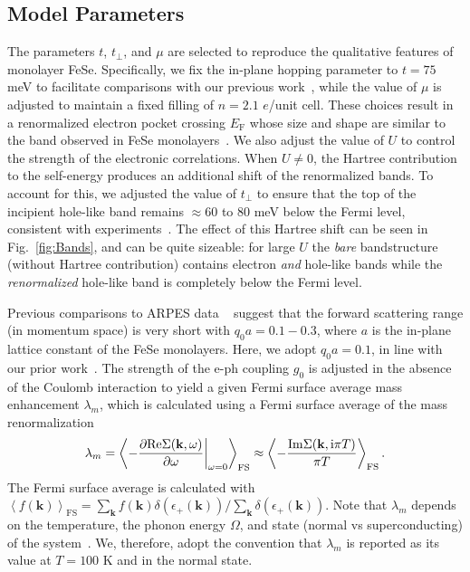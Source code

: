 \documentclass[%
 reprint,
 superscriptaddress,
nofootinbib,
nobibnotes,
 amsmath,amssymb,
 aps,
 prb,
 dvipsnames, 
 floatfix
]{revtex4-2}
\newcommand{\eph}{e-ph}
\begin{document}
\subsection{Model Parameters}
The parameters $t$, $t_\perp$, and $\mu$ are selected to reproduce the qualitative features of monolayer FeSe. Specifically, we fix the in-plane hopping parameter to $t = 75$ meV to facilitate comparisons with our previous work~\cite{Rademaker2016,WangSUST}, while the value of $\mu$ is adjusted to maintain a fixed filling 
of $n = 2.1$ $e$/unit cell. These choices result in a renormalized electron pocket crossing $E_\mathrm{F}$ whose size and shape are similar to the band observed in FeSe monolayers~\cite{Rademaker2016}. We also adjust the value of $U$ to control the strength of the electronic correlations. 
When $U\ne 0$, the Hartree contribution to the self-energy produces 
an additional shift of the renormalized bands. To account for this, we adjusted the value of $t_\perp$ to ensure that the top of the incipient hole-like band remains $\approx 60$ to $80$ meV below the Fermi level, consistent with experiments~\cite{He:2013cna, Lee2014, Shigekawa24470}. The effect of this Hartree shift can be seen in Fig.~\ref{fig:Bands}, and can be quite sizeable: for large $U$ the {\em bare} bandstructure (without Hartree contribution) contains electron {\em and} hole-like bands while the \emph{renormalized} hole-like band is completely below the Fermi level.

Previous comparisons to ARPES data ~\cite{Lee2014,Rademaker2016} suggest that 
the forward scattering range (in momentum space) is very short 
with $q_0a = 0.1 - 0.3$, where $a$ is the in-plane lattice constant of the FeSe monolayers. Here, we adopt $q_0a = 0.1$, in line with our prior work~\cite{Rademaker2016}. 
The strength of the {\eph} coupling $g_0$ is adjusted in the absence of the Coulomb interaction to yield a given Fermi surface 
average mass enhancement $\lambda_m$, which is calculated using a 
Fermi surface average of the mass renormalization 
\begin{equation*}
    \lambda_m = \left\langle -\frac{\partial \mathrm{Re}\Sigma({\bf k},\omega)}{\partial \omega}\bigg|_{\omega=0} \right\rangle_\text{FS}
    \approx \left\langle -\frac{\mathrm{Im}\Sigma({\bf k},\text{i}\pi T)}{\pi T} \right\rangle_\text{FS}.
\end{equation*}
The Fermi surface average is calculated with $\left\langle f(\mathbf{k}) \right\rangle_\text{FS} = \sum_{\mathbf{k}} f(\mathbf{k}) \delta(\epsilon_{+}(\mathbf{k})) / \sum_{\mathbf{k}} \delta(\epsilon_{+}(\mathbf{k}))$.
Note that $\lambda_m$ depends on the temperature, the phonon energy $\Omega$, and 
state (normal vs superconducting) of the system~\cite{WangSUST, Kulic2017}. We, therefore, adopt the convention that $\lambda_m$ is reported as its value at $T = 100$ K and in the normal state. 
\end{document}
